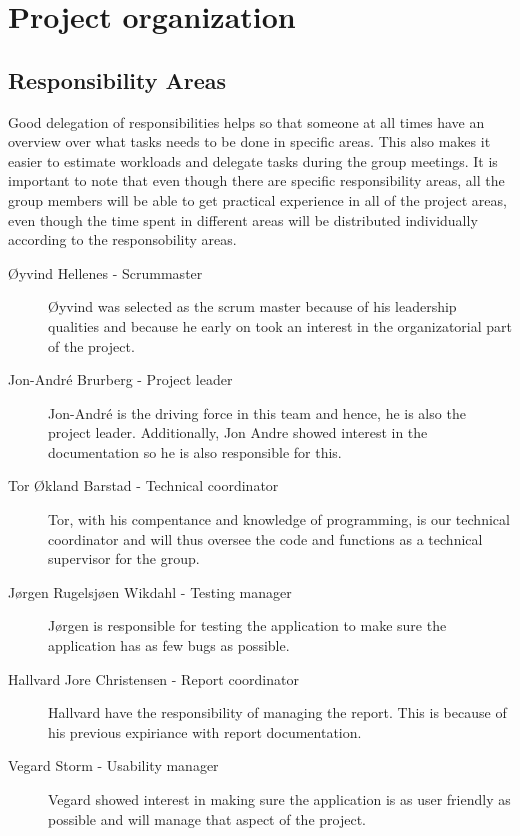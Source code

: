 \section{Project organization}
\thispagestyle{plain}
	\subsection{Responsibility Areas}

Good delegation of responsibilities helps so that someone at all times have an overview over what tasks needs to be done in specific areas. This also makes it easier to estimate workloads and delegate tasks during the group meetings. It is important to note that even though there are specific responsibility areas, all the group members will be able to get practical experience in all of the project areas, even though the time spent in different areas will be distributed individually according to the responsobility areas.

\begin{description}
\item[Øyvind Hellenes - Scrummaster] Øyvind was selected as the scrum master because of his leadership qualities and because he early on took an interest in the organizatorial part of the project.
\item[Jon-André Brurberg - Project leader] Jon-André is the driving force in this team and hence, he is also the project leader. Additionally, Jon Andre showed interest in the documentation so he is also responsible for this.
\item[Tor Økland Barstad - Technical coordinator] Tor, with his compentance and knowledge of programming, is our technical coordinator and will thus oversee the code and functions as a technical supervisor for the group.
\item[Jørgen Rugelsjøen Wikdahl - Testing manager] Jørgen is responsible for testing the application to make sure the application has as few bugs as possible.
\item[Hallvard Jore Christensen - Report coordinator] Hallvard have the responsibility of managing the report. This is because of his previous expiriance with report documentation.
\item[Vegard Storm - Usability manager] Vegard showed interest in making sure the application is as user friendly as possible and will manage that aspect of the project.
\end{description}
	
